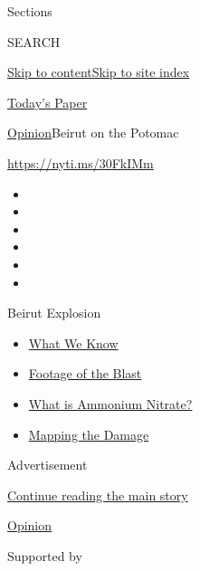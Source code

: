Sections

SEARCH

\protect\hyperlink{site-content}{Skip to
content}\protect\hyperlink{site-index}{Skip to site index}

\href{https://myaccount.nytimes.com/auth/login?response_type=cookie\&client_id=vi}{}

\href{https://www.nytimes.com/section/todayspaper}{Today's Paper}

\href{/section/opinion}{Opinion}\textbar{}Beirut on the Potomac

\href{https://nyti.ms/30FkIMm}{https://nyti.ms/30FkIMm}

\begin{itemize}
\item
\item
\item
\item
\item
\item
\end{itemize}

Beirut Explosion

\begin{itemize}
\tightlist
\item
  \href{https://www.nytimes.com/2020/08/05/world/middleeast/beirut-explosion-what-happened.html?action=click\&pgtype=Article\&state=default\&region=TOP_BANNER\&context=storylines_menu}{What
  We Know}
\item
  \href{https://www.nytimes.com/2020/08/05/video/beirut-explosion-footage.html?action=click\&pgtype=Article\&state=default\&region=TOP_BANNER\&context=storylines_menu}{Footage
  of the Blast}
\item
  \href{https://www.nytimes.com/2020/08/05/world/middleeast/beirut-explosion-ammonium-nitrate.html?action=click\&pgtype=Article\&state=default\&region=TOP_BANNER\&context=storylines_menu}{What
  is Ammonium Nitrate?}
\item
  \href{https://www.nytimes.com/interactive/2020/08/04/world/middleeast/beirut-explosion-damage.html?action=click\&pgtype=Article\&state=default\&region=TOP_BANNER\&context=storylines_menu}{Mapping
  the Damage}
\end{itemize}

Advertisement

\protect\hyperlink{after-top}{Continue reading the main story}

\href{/section/opinion}{Opinion}

Supported by

